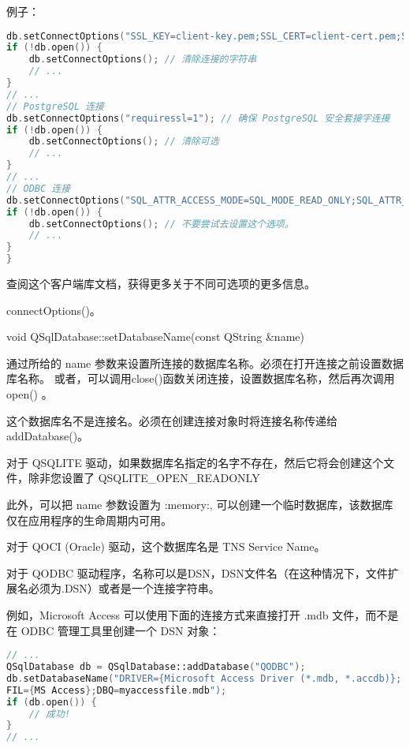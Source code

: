 \clearpage

例子：

\begin{lstlisting}[language=C++]
db.setConnectOptions("SSL_KEY=client-key.pem;SSL_CERT=client-cert.pem;SSL_CA=ca-cert.pem;CLIENT_IGNORE_SPACE=1"); // 使用安全套连字进行连接
if (!db.open()) {
	db.setConnectOptions(); // 清除连接的字符串
	// ...
}
// ...
// PostgreSQL 连接
db.setConnectOptions("requiressl=1"); // 确保 PostgreSQL 安全套接字连接
if (!db.open()) {
	db.setConnectOptions(); // 清除可选
	// ...
}
// ...
// ODBC 连接
db.setConnectOptions("SQL_ATTR_ACCESS_MODE=SQL_MODE_READ_ONLY;SQL_ATTR_TRACE=SQL_OPT_TRACE_ON"); // 设置 ODBC 连项
if (!db.open()) {
	db.setConnectOptions(); // 不要尝试去设置这个选项。
	// ...
}
}
\end{lstlisting}

查阅这个客户端库文档，获得更多关于不同可选项的更多信息。

\begin{seeAlso}
connectOptions()。
\end{seeAlso}



void QSqlDatabase::setDatabaseName(const QString \&name)

通过所给的 name 参数来设置所连接的数据库名称。必须在打开连接之前设置数据库名称。 或者，可以调用close()函数关闭连接，设置数据库名称，然后再次调用open() 。

\begin{notice}
这个数据库名不是连接名。必须在创建连接对象时将连接名称传递给 addDatabase()。
\end{notice}


对于 QSQLITE 驱动，如果数据库名指定的名字不存在，然后它将会创建这个文件，除非您设置了 QSQLITE\_OPEN\_READONLY

此外，可以把 name 参数设置为 :memory:, 可以创建一个临时数据库，该数据库仅在应用程序的生命周期内可用。

对于 QOCI (Oracle) 驱动，这个数据库名是 TNS Service Name。

对于 QODBC 驱动程序，名称可以是DSN，DSN文件名（在这种情况下，文件扩展名必须为.DSN）或者是一个连接字符串。

例如，Microsoft Access 可以使用下面的连接方式来直接打开 .mdb 文件，而不是在 ODBC 管理工具里创建一个 DSN 对象：

\clearpage

\begin{lstlisting}[language=C++]
// ...
QSqlDatabase db = QSqlDatabase::addDatabase("QODBC");
db.setDatabaseName("DRIVER={Microsoft Access Driver (*.mdb, *.accdb)};
FIL={MS Access};DBQ=myaccessfile.mdb");
if (db.open()) {
	// 成功!
}
// ...
\end{lstlisting}

